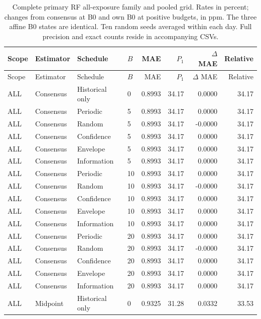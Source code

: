 \small\setlength{\tabcolsep}{4pt}
\begin{longtable}{llllrrrr}
\caption{Complete primary RF all-exposure family and pooled grid. Rates in percent; changes from consensus at B0 and own B0 at positive budgets, in ppm. The three affine B0 states are identical. Ten random seeds averaged within each day. Full precision and exact counts reside in accompanying CSVs.}\label{tab:s_all}\\
\toprule
Scope & Estimator & Schedule & $B$ & MAE & $P_1$ & $\Delta$ MAE & Relative \\ \midrule\endfirsthead
\toprule
Scope & Estimator & Schedule & $B$ & MAE & $P_1$ & $\Delta$ MAE & Relative \\ \midrule\endhead
\bottomrule\endfoot
ALL & Consensus & Historical only & 0 & 0.8993 & 34.17 & 0.0000 & 34.17 \\
ALL & Consensus & Periodic & 5 & 0.8993 & 34.17 & 0.0000 & 34.17 \\
ALL & Consensus & Random & 5 & 0.8993 & 34.17 & -0.0000 & 34.17 \\
ALL & Consensus & Confidence & 5 & 0.8993 & 34.17 & 0.0000 & 34.17 \\
ALL & Consensus & Envelope & 5 & 0.8993 & 34.17 & 0.0000 & 34.17 \\
ALL & Consensus & Information & 5 & 0.8993 & 34.17 & 0.0000 & 34.17 \\
ALL & Consensus & Periodic & 10 & 0.8993 & 34.17 & 0.0000 & 34.17 \\
ALL & Consensus & Random & 10 & 0.8993 & 34.17 & -0.0000 & 34.17 \\
ALL & Consensus & Confidence & 10 & 0.8993 & 34.17 & 0.0000 & 34.17 \\
ALL & Consensus & Envelope & 10 & 0.8993 & 34.17 & 0.0000 & 34.17 \\
ALL & Consensus & Information & 10 & 0.8993 & 34.17 & 0.0000 & 34.17 \\
ALL & Consensus & Periodic & 20 & 0.8993 & 34.17 & 0.0000 & 34.17 \\
ALL & Consensus & Random & 20 & 0.8993 & 34.17 & -0.0000 & 34.17 \\
ALL & Consensus & Confidence & 20 & 0.8993 & 34.17 & 0.0000 & 34.17 \\
ALL & Consensus & Envelope & 20 & 0.8993 & 34.17 & 0.0000 & 34.17 \\
ALL & Consensus & Information & 20 & 0.8993 & 34.17 & 0.0000 & 34.17 \\
ALL & Midpoint & Historical only & 0 & 0.9325 & 31.28 & 0.0332 & 33.53 \\

\end{longtable}
